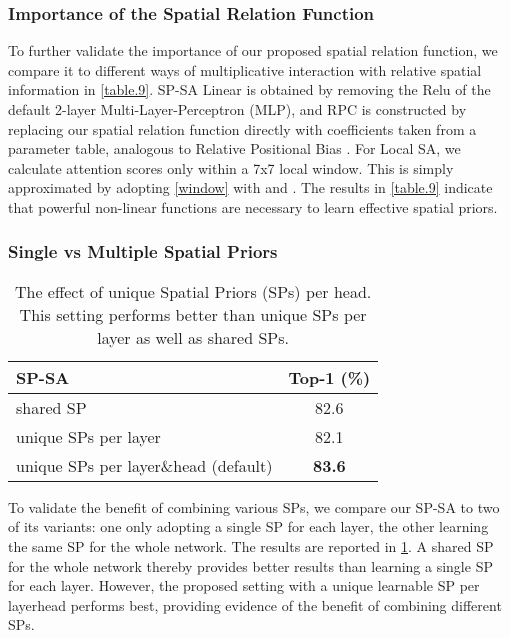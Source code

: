 \documentclass[authorversion, sigconf, acmthm=false, nonacm=true]{acmart}
\begin{document}
\subsubsection{Importance of the Spatial Relation Function}
To further validate the importance of our proposed spatial relation function, we compare it to different ways of multiplicative interaction
with relative spatial information in \cref{table.9}. SP-SA Linear is obtained by removing the Relu of the default 2-layer Multi-Layer-Perceptron (MLP), 
and RPC is constructed by replacing our spatial relation function directly with coefficients taken from a parameter table, analogous to Relative Positional Bias \cite{liu2021swin}. 
For Local SA, we calculate attention scores only within a 7x7 local window. 
This is simply approximated by adopting \cref{window} with  and .
The results in \cref{table.9} indicate that powerful non-linear functions are necessary to learn
effective spatial priors. 





\subsubsection{Single vs Multiple Spatial Priors}

\begin{table}[h]
  \caption{The effect of unique Spatial Priors (SPs) per head. This setting performs better than unique SPs per layer as well as shared SPs.
  }
  \centering
\begin{tabular}{lc}
     \toprule
     SP-SA &  Top-1 (\%)    \\
     \midrule
    shared SP            &   82.6 \\
     unique SPs per layer &   82.1 \\
     
unique SPs per layer\&head (default) &  \textbf{83.6} \\
\bottomrule
  \end{tabular}
\label{table7}
  \end{table}


To validate the benefit of combining various SPs,
we compare our SP-SA to two of its variants: 
one only adopting a single SP for each layer, the other learning the same SP for the whole network. 
The results are reported in \cref{table7}. A shared SP for the whole network thereby provides better results than learning a single SP for each layer. However, the proposed setting with a unique learnable SP per layerhead performs best, providing evidence of the benefit of combining different SPs. 
\end{document}
